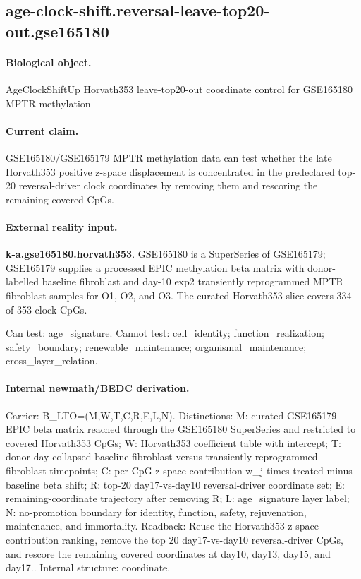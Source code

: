 \subsection{age-clock-shift.reversal-leave-top20-out.gse165180}

\paragraph{Biological object.} AgeClockShiftUp Horvath353 leave-top20-out coordinate control for GSE165180 MPTR methylation

\paragraph{Current claim.} GSE165180/GSE165179 MPTR methylation data can test whether the late Horvath353 positive z-space displacement is concentrated in the predeclared top-20 reversal-driver clock coordinates by removing them and rescoring the remaining covered CpGs.

\paragraph{External reality input.}
\textbf{k-a.gse165180.horvath353}. GSE165180 is a SuperSeries of GSE165179; GSE165179 supplies a processed EPIC methylation beta matrix with donor-labelled baseline fibroblast and day-10 exp2 transiently reprogrammed MPTR fibroblast samples for O1, O2, and O3. The curated Horvath353 slice covers 334 of 353 clock CpGs.

Can test: age\_signature. Cannot test: cell\_identity; function\_realization; safety\_boundary; renewable\_maintenance; organismal\_maintenance; cross\_layer\_relation.

\paragraph{Internal newmath/BEDC derivation.} Carrier: B\_LTO=(M,W,T,C,R,E,L,N). Distinctions: M: curated GSE165179 EPIC beta matrix reached through the GSE165180 SuperSeries and restricted to covered Horvath353 CpGs; W: Horvath353 coefficient table with intercept; T: donor-day collapsed baseline fibroblast versus transiently reprogrammed fibroblast timepoints; C: per-CpG z-space contribution w\_j times treated-minus-baseline beta shift; R: top-20 day17-vs-day10 reversal-driver coordinate set; E: remaining-coordinate trajectory after removing R; L: age\_signature layer label; N: no-promotion boundary for identity, function, safety, rejuvenation, maintenance, and immortality. Readback: Reuse the Horvath353 z-space contribution ranking, remove the top 20 day17-vs-day10 reversal-driver CpGs, and rescore the remaining covered coordinates at day10, day13, day15, and day17.. Internal structure: coordinate.

